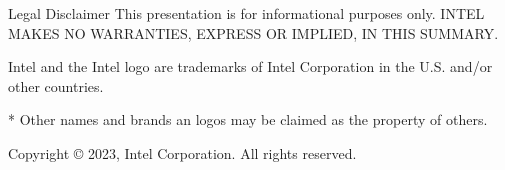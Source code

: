 
\begin{frame}[c]{Legal Disclaimer}
  This presentation is for informational purposes only.
  INTEL MAKES NO WARRANTIES, EXPRESS OR IMPLIED, IN THIS SUMMARY.

  \vspace{\baselineskip}
  Intel and the Intel logo are trademarks of Intel Corporation in the
  U.S. and/or other countries.

  \vspace{\baselineskip}
  * Other names and brands an logos may be claimed as the property of others.

  \vspace{\baselineskip}
  Copyright © 2023, Intel Corporation. All rights reserved.
\end{frame}
